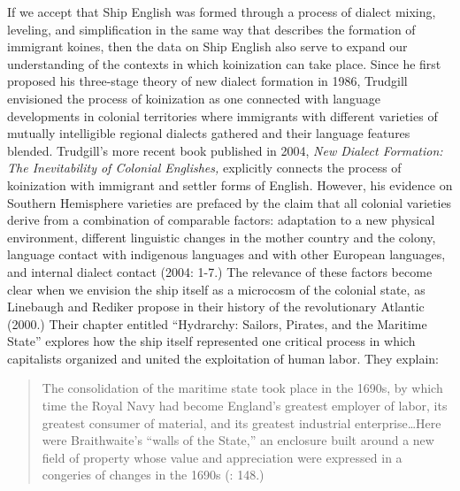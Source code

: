   If we accept that Ship English was formed through a process of dialect mixing, leveling, and simplification in the same way that \citet{Trudgill1986} describes the formation of immigrant koines, then the data on Ship English also serve to expand our understanding of the contexts in which koinization can take place. Since he first proposed his three-stage theory of new dialect formation in 1986, Trudgill envisioned the process of koinization as one connected with language developments in colonial territories where immigrants with different varieties of mutually intelligible regional dialects gathered and their language features blended. Trudgill’s more recent book published in 2004, \textit{New Dialect Formation: The Inevitability of Colonial Englishes,} explicitly connects the process of koinization with immigrant and settler forms of English. However, his evidence on Southern Hemisphere varieties are prefaced by the claim that all colonial varieties derive from a combination of comparable factors: adaptation to a new physical environment, different linguistic changes in the mother country and the colony, language contact with indigenous languages and with other European languages, and internal dialect contact (2004: 1-7.) The relevance of these factors become clear when we envision the ship itself as a microcosm of the colonial state, as Linebaugh and Rediker propose in their history of the revolutionary Atlantic (2000.) Their chapter entitled “Hydrarchy: Sailors, Pirates, and the Maritime State” explores how the ship itself represented one critical process in which capitalists organized and united the exploitation of human labor. They explain:

\begin{quotation}
The consolidation of the maritime state took place in the 1690s, by which time the Royal Navy had become England’s greatest employer of labor, its greatest consumer of material, and its greatest industrial enterprise…Here were Braithwaite’s “walls of the State,” an enclosure built around a new field of property whose value and appreciation were expressed in a congeries of changes in the 1690s (\citealt{LinebaughRediker2004}: 148.)\end{quotation}

